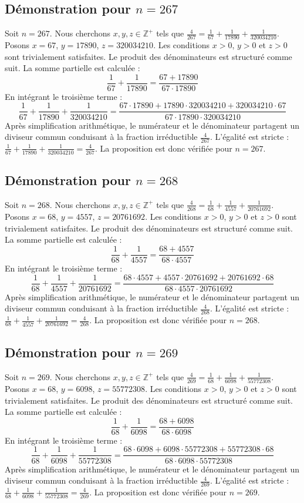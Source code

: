 \documentclass[11pt,a4paper]{article}
\begin{document}
\subsection{Démonstration pour $n = 267$}
Soit $n = 267$. Nous cherchons $x, y, z \in \mathbb{Z}^{+}$ tels que $\frac{4}{267} = \frac{1}{67} + \frac{1}{17890} + \frac{1}{320034210}$.
Posons $x = 67$, $y = 17890$, $z = 320034210$.
Les conditions $x > 0$, $y > 0$ et $z > 0$ sont trivialement satisfaites.
Le produit des dénominateurs est structuré comme suit. La somme partielle est calculée :
$$ \frac{1}{67} + \frac{1}{17890} = \frac{67+17890}{67 \cdot 17890} $$
En intégrant le troisième terme :
$$ \frac{1}{67} + \frac{1}{17890} + \frac{1}{320034210} = \frac{67 \cdot 17890 + 17890 \cdot 320034210 + 320034210 \cdot 67}{67 \cdot 17890 \cdot 320034210} $$
Après simplification arithmétique, le numérateur et le dénominateur partagent un diviseur commun conduisant à la fraction irréductible $\frac{4}{267}$.
L'égalité est stricte : $\frac{1}{67} + \frac{1}{17890} + \frac{1}{320034210} = \frac{4}{267}$.
La proposition est donc vérifiée pour $n = 267$.
\subsection{Démonstration pour $n = 268$}
Soit $n = 268$. Nous cherchons $x, y, z \in \mathbb{Z}^{+}$ tels que $\frac{4}{268} = \frac{1}{68} + \frac{1}{4557} + \frac{1}{20761692}$.
Posons $x = 68$, $y = 4557$, $z = 20761692$.
Les conditions $x > 0$, $y > 0$ et $z > 0$ sont trivialement satisfaites.
Le produit des dénominateurs est structuré comme suit. La somme partielle est calculée :
$$ \frac{1}{68} + \frac{1}{4557} = \frac{68+4557}{68 \cdot 4557} $$
En intégrant le troisième terme :
$$ \frac{1}{68} + \frac{1}{4557} + \frac{1}{20761692} = \frac{68 \cdot 4557 + 4557 \cdot 20761692 + 20761692 \cdot 68}{68 \cdot 4557 \cdot 20761692} $$
Après simplification arithmétique, le numérateur et le dénominateur partagent un diviseur commun conduisant à la fraction irréductible $\frac{4}{268}$.
L'égalité est stricte : $\frac{1}{68} + \frac{1}{4557} + \frac{1}{20761692} = \frac{4}{268}$.
La proposition est donc vérifiée pour $n = 268$.
\subsection{Démonstration pour $n = 269$}
Soit $n = 269$. Nous cherchons $x, y, z \in \mathbb{Z}^{+}$ tels que $\frac{4}{269} = \frac{1}{68} + \frac{1}{6098} + \frac{1}{55772308}$.
Posons $x = 68$, $y = 6098$, $z = 55772308$.
Les conditions $x > 0$, $y > 0$ et $z > 0$ sont trivialement satisfaites.
Le produit des dénominateurs est structuré comme suit. La somme partielle est calculée :
$$ \frac{1}{68} + \frac{1}{6098} = \frac{68+6098}{68 \cdot 6098} $$
En intégrant le troisième terme :
$$ \frac{1}{68} + \frac{1}{6098} + \frac{1}{55772308} = \frac{68 \cdot 6098 + 6098 \cdot 55772308 + 55772308 \cdot 68}{68 \cdot 6098 \cdot 55772308} $$
Après simplification arithmétique, le numérateur et le dénominateur partagent un diviseur commun conduisant à la fraction irréductible $\frac{4}{269}$.
L'égalité est stricte : $\frac{1}{68} + \frac{1}{6098} + \frac{1}{55772308} = \frac{4}{269}$.
La proposition est donc vérifiée pour $n = 269$.
\end{document}
